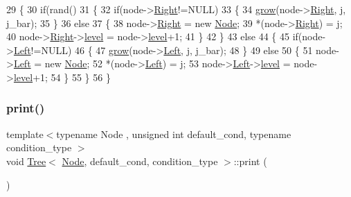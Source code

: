 \begin{DoxyCode}
29 \{
30     \textcolor{keywordflow}{if}(rand() %
31     \{
32         \textcolor{keywordflow}{if}(node->\hyperlink{struct_node_ae5ad7032e0a9a52f5a849e33e23a7dfa}{Right}!=NULL)
33         \{
34             \hyperlink{class_tree_ab05cd263b882d58cee3c671c6ba646fd}{grow}(node->\hyperlink{struct_node_ae5ad7032e0a9a52f5a849e33e23a7dfa}{Right}, j, j\_bar);
35         \}
36         \textcolor{keywordflow}{else}
37         \{
38             node->\hyperlink{struct_node_ae5ad7032e0a9a52f5a849e33e23a7dfa}{Right} = \textcolor{keyword}{new} \hyperlink{struct_node}{Node};
39             *(node->\hyperlink{struct_node_ae5ad7032e0a9a52f5a849e33e23a7dfa}{Right}) = j;
40             node->\hyperlink{struct_node_ae5ad7032e0a9a52f5a849e33e23a7dfa}{Right}->\hyperlink{struct_node_a64a379c6dd2c75ade9687670c517b7e7}{level} = node->\hyperlink{struct_node_a64a379c6dd2c75ade9687670c517b7e7}{level}+1;
41         \}
42     \}
43     \textcolor{keywordflow}{else}
44     \{
45         \textcolor{keywordflow}{if}(node->\hyperlink{struct_node_a779292dace788d33114830cca763ccf3}{Left}!=NULL)
46         \{
47             \hyperlink{class_tree_ab05cd263b882d58cee3c671c6ba646fd}{grow}(node->\hyperlink{struct_node_a779292dace788d33114830cca763ccf3}{Left}, j, j\_bar);
48         \}
49         \textcolor{keywordflow}{else}
50         \{
51             node->\hyperlink{struct_node_a779292dace788d33114830cca763ccf3}{Left} = \textcolor{keyword}{new} \hyperlink{struct_node}{Node};
52             *(node->\hyperlink{struct_node_a779292dace788d33114830cca763ccf3}{Left}) = j;
53             node->\hyperlink{struct_node_a779292dace788d33114830cca763ccf3}{Left}->\hyperlink{struct_node_a64a379c6dd2c75ade9687670c517b7e7}{level} = node->\hyperlink{struct_node_a64a379c6dd2c75ade9687670c517b7e7}{level}+1;
54         \}
55     \}
56 \}
\end{DoxyCode}
\mbox{\label{class_tree_ac4a139b22a1188e616efbd2919871959}} 
\subsubsection{\texorpdfstring{print()}{print()}\hspace{0.1cm}{\footnotesize\ttfamily [1/2]}}
{\footnotesize\ttfamily template$<$typename Node , unsigned int default\+\_\+cond, typename condition\+\_\+type $>$ \\
void \hyperlink{class_tree}{Tree}$<$ \hyperlink{struct_node}{Node}, default\+\_\+cond, condition\+\_\+type $>$\+::print (\begin{DoxyParamCaption}{ }\end{DoxyParamCaption})}

